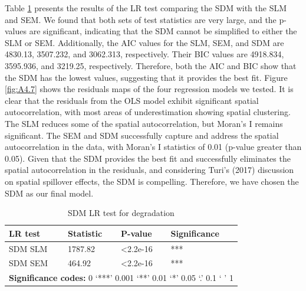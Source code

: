 Table \ref{tab: A4.10} presents the results of the LR test comparing the SDM with the SLM and SEM. We found that both sets of test statistics are very large, and the p-values are significant, indicating that the SDM cannot be simplified to either the SLM or SEM. Additionally, the AIC values for the SLM, SEM, and SDM are 4830.13, 3507.232, and 3062.313, respectively. Their BIC values are 4918.834, 3595.936, and 3219.25, respectively. Therefore, both the AIC and BIC show that the SDM has the lowest values, suggesting that it provides the best fit.
Figure \ref{fig:A4.7} shows the residuals maps of the four regression models we tested. It is clear that the residuals from the OLS model exhibit significant spatial autocorrelation, with most areas of underestimation showing spatial clustering. The SLM reduces some of the spatial autocorrelation, but Moran's I remains significant. The SEM and SDM successfully capture and address the spatial autocorrelation in the data, with Moran's I statistics of 0.01 (p-value greater than 0.05). Given that the SDM provides the best fit and successfully eliminates the spatial autocorrelation in the residuals, and considering Turi's (2017) discussion on spatial spillover effects, the SDM is compelling. Therefore, we have chosen the SDM as our final model.






\begin{table}[]
\centering
\begin{tabular}{|l|l|l|l|}
\hline
\textbf{LR test} & \textbf{Statistic} & \textbf{P-value} & \textbf{Significance} \\ \hline
SDM SLM                  & 1787.82            & \textless 2.2e-16 & ***                   \\ \hline
SDM SEM                & 464.92            & \textless 2.2e-16 & ***                   \\ \hline \hline
\multicolumn{4}{|l|}{\textbf{Significance codes:} 0 ‘***’ 0.001 ‘**’ 0.01 ‘*’ 0.05 ‘.’ 0.1 ‘ ’ 1} \\ \hline
\end{tabular}
\caption{
SDM LR test for degradation
}
\label{tab: A4.10}
\end{table}



